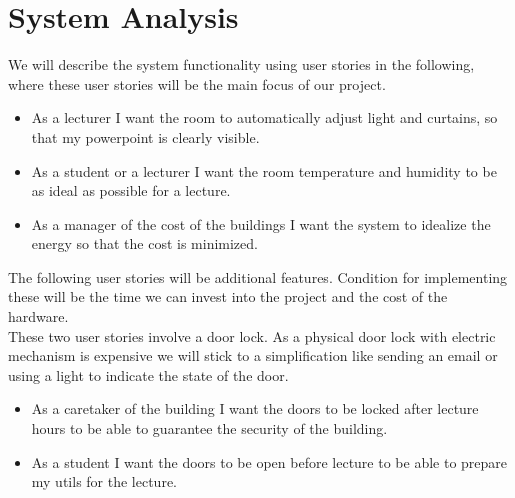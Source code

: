 \documentclass[runningheads]{llncs}
\begin{document}
\section{System Analysis}
We will describe the system functionality using user stories in the following, where these user stories will be the main focus of our project.
\begin{itemize}
\item As a lecturer I want the room to automatically adjust light and curtains, so that my powerpoint is clearly visible.\\

\item As a student or a lecturer I want the room temperature and humidity to be as ideal as possible for a lecture.\\

\item As a manager of the cost of the buildings I want the system to idealize the energy so that the cost is minimized.\\
\end{itemize}

The following user stories will be additional features. Condition for implementing these will be the time we can invest into the project and the cost of the hardware.\\ 
These two user stories involve a door lock. As a physical door lock with electric mechanism is expensive we will stick to a simplification like sending an email or using a light to indicate the state of the door.
\begin{itemize}
\item As a caretaker of the building I want the doors to be locked after lecture hours to be able to guarantee the security of the building. \\

\item As a student I want the doors to be open before lecture to be able to prepare my utils for the lecture.\\
\end{itemize}
\end{document}
